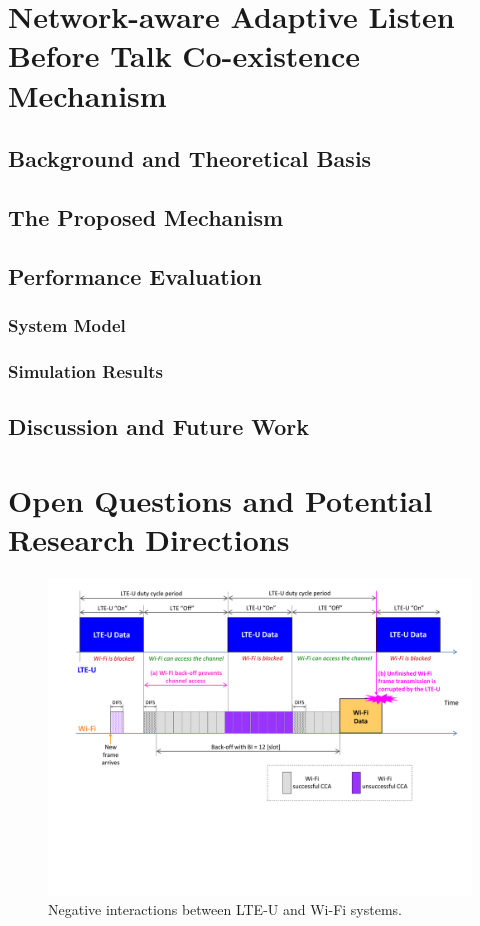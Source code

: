 \documentclass[12pt,onecolumn]{article}
\begin{document}
\section{Network-aware Adaptive Listen Before Talk Co-existence Mechanism}
\subsection{Background and Theoretical Basis}
\subsection{The Proposed Mechanism}
\subsection{Performance Evaluation}
\subsubsection{System Model}
\subsubsection{Simulation Results}
\subsection{Discussion and Future Work}



\section{Open Questions and Potential Research Directions}
\label{sec:directions}

\begin{figure}[!t]
\centering
\includegraphics[width=1.0\columnwidth]{figures2/LTE-U-enhancement1}
\caption{Negative interactions between LTE-U and Wi-Fi systems.}
\label{figs:LTE-U-enhancement1}
\end{figure}
\end{document}
